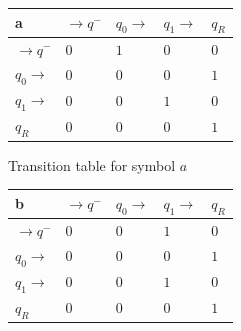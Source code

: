 \documentclass{mini}
\begin{document}
%
%
\begin{figure}[H]
    \begin{center}
        
        \setlength{\tabcolsep}{4pt}
        \renewcommand{\arraystretch}{1.4}
        
        \begin{subfigure}{.5\textwidth}
            
            \centering
            \begin{tabular}{|P{1.0cm} || P{0.8cm} | P{0.8cm} | P{0.8cm} | P{0.8cm}|}
                
                \hline
                a & $\rightarrow q^-$ & $q_0 \rightarrow$ & $q_1 \rightarrow$ & $q_R$ \\
                \hline
                \hline
                $\rightarrow q^-$ 		& $0$ & $1$ & $0$ & $0$ \\
                \hline
                $q_0 \rightarrow$ 		& $0$ & $0$ & $0$ & $1$ \\
                \hline
                $q_1 \rightarrow$ 		& $0$ & $0$ & $1$ & $0$ \\
                \hline
                $q_R$  					& $0$ & $0$ & $0$ & $1$ \\
                \hline
                
            \end{tabular}
            
            \caption{Transition table for symbol $a$}
            \label{fig:ttable_bin_a}	
            
        \end{subfigure}%
        \begin{subfigure}{.5\textwidth}
            
            \centering
            \begin{tabular}{|P{1.0cm} || P{0.8cm} | P{0.8cm} | P{0.8cm} | P{0.8cm}|}
                
                \hline
                b & $\rightarrow q^-$ & $q_0 \rightarrow$ & $q_1 \rightarrow$ & $q_R$ \\
                \hline
                \hline
                $\rightarrow q^-$ 		& $0$ & $0$ & $1$ & $0$ \\
                \hline
                $q_0 \rightarrow$ 		& $0$ & $0$ & $0$ & $1$ \\
                \hline
                $q_1 \rightarrow$ 		& $0$ & $0$ & $1$ & $0$ \\
                \hline
                $q_R$  					& $0$ & $0$ & $0$ & $1$ \\
                \hline
                

\end{tabular}
\end{subfigure}
\end{center}
\end{figure}
\end{document}
